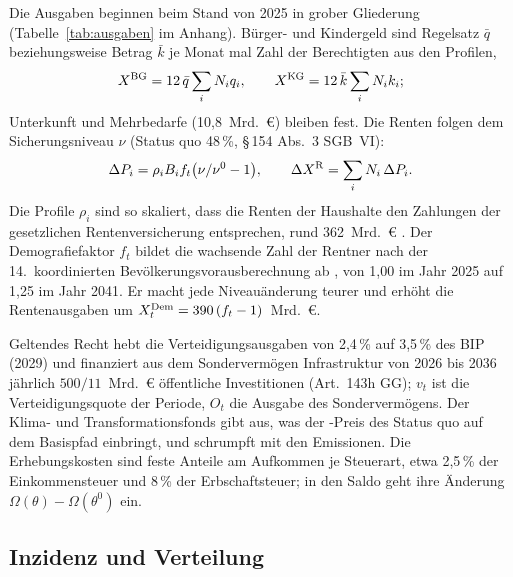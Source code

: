 Die Ausgaben beginnen beim Stand von 2025 in grober Gliederung
(Tabelle~\ref{tab:ausgaben} im Anhang). Bürger- und Kindergeld sind Regelsatz
$\bar q$ beziehungsweise Betrag $\bar k$ je Monat mal Zahl der Berechtigten
aus den Profilen,
\begin{equation}
  X^{\mathrm{BG}} = 12\,\bar q\sum_i N_i q_i,\qquad X^{\mathrm{KG}} = 12\,\bar k\sum_i N_i k_i ;
\end{equation}
Unterkunft und Mehrbedarfe (10,8~Mrd.~\euro) bleiben fest. Die Renten folgen
dem Sicherungsniveau $\nu$ (Status quo 48\,\%, §\,154 Abs.~3 SGB~VI):
\begin{equation}
  \Delta P_i = \rho_i B_i f_t\bigl(\nu/\nu^0 - 1\bigr),\qquad \Delta X^{\mathrm{R}} = \sum_i N_i\,\Delta P_i .
\end{equation}
Die Profile $\rho_i$ sind so skaliert, dass die Renten der Haushalte den
Zahlungen der gesetzlichen Rentenversicherung entsprechen, rund
362~Mrd.~\euro{} \parencite{bmas2025}. Der Demografiefaktor $f_t$ bildet die
wachsende Zahl der Rentner nach der 14.~koordinierten
Bevölkerungsvorausberechnung ab \parencite{destatis2019}, von 1,00 im Jahr
2025 auf 1,25 im Jahr 2041. Er macht jede Niveauänderung teurer und erhöht die
Rentenausgaben um $X^{\mathrm{Dem}}_t = 390\,(f_t - 1)$~Mrd.~\euro.

Geltendes Recht hebt die Verteidigungsausgaben von 2,4\,\% auf 3,5\,\% des BIP
(2029) und finanziert aus dem Sondervermögen Infrastruktur von 2026 bis 2036
jährlich $500/11$~Mrd.~\euro{} öffentliche Investitionen (Art.~143h GG); $v_t$
ist die Verteidigungsquote der Periode, $O_t$ die Ausgabe des Sondervermögens.
Der Klima- und Transformationsfonds gibt aus, was der \COz-Preis des Status
quo auf dem Basispfad einbringt, und schrumpft mit den Emissionen. Die
Erhebungskosten sind feste Anteile am Aufkommen je Steuerart, etwa 2,5\,\%
der Einkommensteuer und 8\,\% der Erbschaftsteuer; in den Saldo geht ihre
Änderung $\Omega(\theta) - \Omega(\theta^0)$ ein.

\subsection{Inzidenz und Verteilung}
\label{sec:inzidenz}

